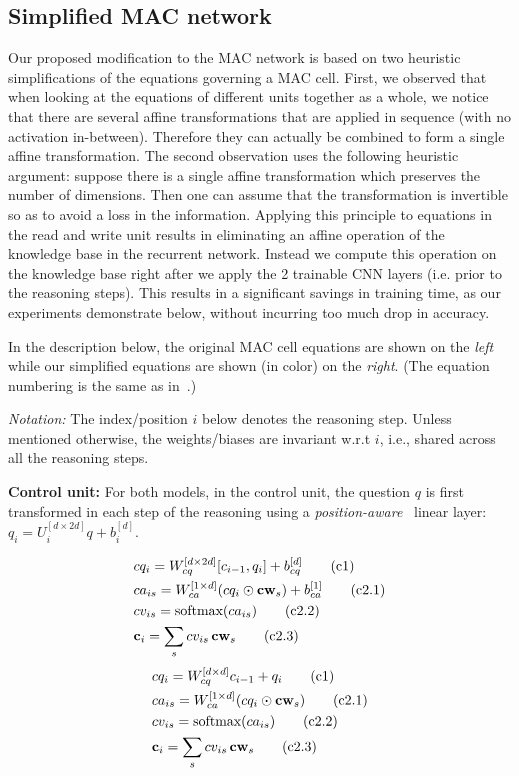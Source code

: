 \subsection{Simplified MAC network}
Our proposed modification to the MAC network is based on two heuristic
simplifications of the equations governing a MAC cell. 
First, we observed that when looking at the equations of different units
together as a whole, we notice that there are several affine transformations
that are applied in sequence (with no activation in-between).
Therefore they can actually be combined to form a single affine transformation.
The second observation uses the following heuristic argument:
suppose there is a single affine transformation which preserves the number
of dimensions. Then one can assume that the transformation is invertible
so as to avoid a loss in the information. Applying this principle to 
equations in the read and write unit results in eliminating an affine
operation of the knowledge base in the recurrent network. Instead we compute
this operation on the knowledge base right after we apply the 2 
trainable CNN layers (i.e. prior to the reasoning steps). This results
in a significant savings in training time, as our experiments demonstrate
below, without incurring too much drop in accuracy.

In the description below, the original MAC cell equations are shown on the \emph{left}
while our simplified equations are shown (in color) on the {\color{Plum} \emph{right}}.
(The equation numbering is the same as in~\cite{hudson2018compositional}.)

\noindent\textit{Notation:} The index/position $i$ below denotes the reasoning step. 
Unless mentioned otherwise, the weights/biases are invariant w.r.t $i$, 
i.e., shared across all the reasoning steps. 

\noindent\textbf{Control unit:} 
For both models, in the control unit, the question $q$ is first transformed in each step of 
the reasoning using a \emph{position-aware}~\cite{hudson2018compositional} 
linear layer: $q_i = U_i^{[d \times 2d]} q + b_i^{[d]}$.

\begin{multicols}{2}
	\noindent
	\begin{align*}
	&cq_i = W_{cq}^{[d \times 2d]} [c_{i-1}, q_i] + b_{cq}^{[d]}  \tag{c1} \\
	&ca_{is} = W_{ca}^{[1 \times d]} (cq_i \odot \mathbf{cw}_s) + b_{ca}^{[1]}
	\tag{c2.1}\\
	&cv_{is} = \textrm{softmax}(ca_{is}) \tag{c2.2}\\
	&\mathbf{c}_i = \sum_s cv_{is} \, \mathbf{cw}_s  \tag{c2.3}
	\end{align*}
	\columnbreak
	{\color{Plum}
	\begin{align*}
	&cq_i = W_{cq}^{[d \times d]} c_{i-1} + q_i  \tag{c1} \\
	&ca_{is} = W_{ca}^{[1 \times d]} (cq_i \odot \mathbf{cw}_s)  \tag{c2.1}\\
	&cv_{is} = \textrm{softmax}(ca_{is}) \tag{c2.2}\\
	&\mathbf{c}_i = \sum_s cv_{is} \, \mathbf{cw}_s  \tag{c2.3}
    \end{align*}}
\end{multicols}

